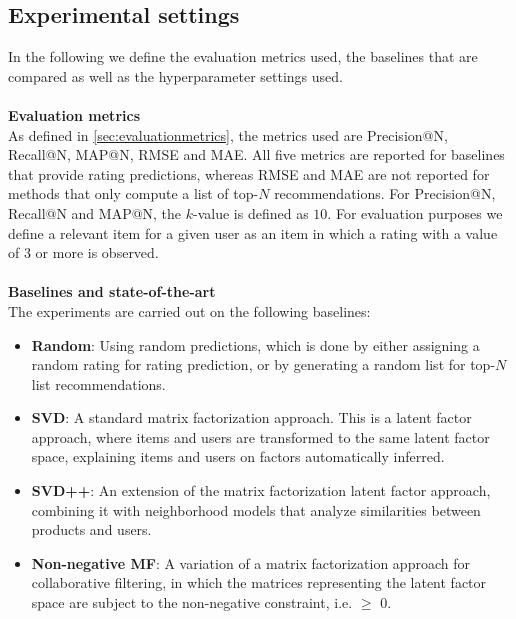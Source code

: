 \subsection{Experimental settings}
In the following we define the evaluation metrics used, the baselines that are compared as well as the hyperparameter settings used.
\\\\
\textbf{Evaluation metrics}\\
As defined in \autoref{sec:evaluationmetrics}, the metrics used are Precision@N, Recall@N, MAP@N, RMSE and MAE.
All five metrics are reported for baselines that provide rating predictions, whereas RMSE and MAE are not reported for methods that only compute a list of top-$N$ recommendations.
For Precision@N, Recall@N and MAP@N, the $k$-value is defined as $10$.
For evaluation purposes we define a relevant item for a given user as an item in which a rating with a value of $3$ or more is observed.
\\\\
\textbf{Baselines and state-of-the-art}\\
The experiments are carried out on the following baselines:
\begin{itemize}
    \item \textbf{Random}: Using random predictions, which is done by either assigning a random rating for rating prediction, or by generating a random list for top-$N$ list recommendations.
    \item \textbf{SVD}: A standard matrix factorization approach. This is a latent factor approach, where items and users are transformed to the same latent factor space, explaining items and users on factors automatically inferred.
    \item \textbf{SVD++}: An extension of the matrix factorization latent factor approach, combining it with neighborhood models that analyze similarities between products and users.
    \item \textbf{Non-negative MF}: A variation of a matrix factorization approach for collaborative filtering, in which the matrices representing the latent factor space are subject to the non-negative constraint, i.e. $\geq$ 0.
\end{itemize}

